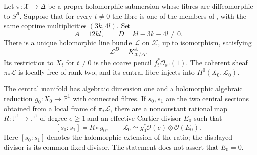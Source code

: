 
\begin{proposition}\hypertarget{tag-033D}{}\label{push:src:E.2.5}


Let $\pi:\mathcal X\to\Delta$ be a proper holomorphic submersion
whose fibres are diffeomorphic to $S^6$.  Suppose that for every
$t\ne0$ the fibre is one of the members of , with the same
coprime multiplicities $(3k,4l)$.  Set
\[
 A=12kl,\qquad D=kl-3k-4l\ne0.
\]
There is a unique holomorphic line bundle $\mathcal L$ on
$\mathcal X$, up to isomorphism, satisfying
\[
 \mathcal L^{D}=K_{\mathcal X/\Delta}^{A}.
\]
Its restriction to $X_t$ for $t\ne0$ is the coarse pencil
$f_t^*\mathcal O_{\mathbb P^1}(1)$.  The coherent sheaf
$\pi_*\mathcal L$ is locally free of rank two, and its central
fibre injects into $H^0(X_0,\mathcal L_0)$.

The central manifold has algebraic dimension one and a
holomorphic algebraic reduction $g_0:X_0\to\mathbb P^1$ with
connected fibres.  If $s_0,s_1$ are the two central sections
obtained from a local frame of $\pi_*\mathcal L$, there are a
nonconstant rational map $R:\mathbb P^1\to\mathbb P^1$ of
degree $e\ge1$ and an effective Cartier divisor $E_0$ such that
\[
 [s_0:s_1]=R\circ g_0,\qquad
 \mathcal L_0\simeq g_0^*\mathcal O(e)\otimes\mathcal O(E_0).
\]
Here $[s_0:s_1]$ denotes the holomorphic extension of the ratio;
the displayed divisor is its common fixed divisor.  The
statement does not assert that $E_0=0$.
\end{proposition}

